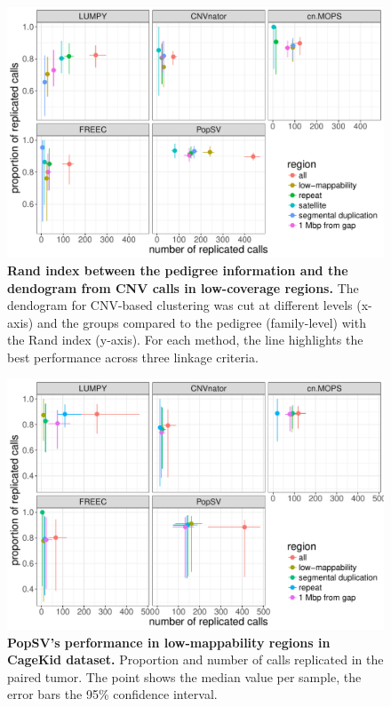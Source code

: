\begin{figure}[htp]
  \includegraphics[width=\linewidth,page=5]{figures/replication-twins.pdf}
  \caption[Rand index between pedigree and CNV-based dendogram in low-coverage regions.]{{\bf Rand index between the pedigree information and the dendogram from CNV calls in low-coverage regions.} {\small The dendogram for CNV-based clustering was cut at different levels (x-axis) and the groups compared to the pedigree (family-level) with the Rand index (y-axis). For each method, the line highlights the best performance across three linkage criteria.}}
  \label{fig:randindex}
\end{figure}

\begin{figure}[htp]
  \includegraphics[width=\linewidth,page=2]{figures/replication-cagekid.pdf}
  \caption[{\sf PopSV}'s performance in low-mappability regions in CageKid dataset.]{{\bf {\sf PopSV}'s performance in low-mappability regions in CageKid dataset.} {\small Proportion and number of calls replicated in the paired tumor. The point shows the median value per sample, the error bars the 95\% confidence interval.}}
  \label{fig:replication:cagekid}
\end{figure}

